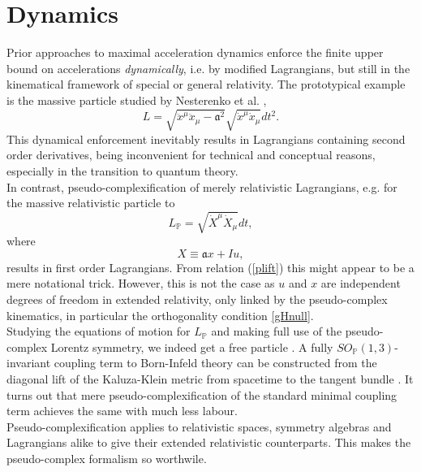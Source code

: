 \documentclass[11pt,a4paper,twoside]{article}
\newcommand{\pc}{\mathbb{P}}
\begin{document}
\section{Dynamics}
Prior approaches \cite{Nestsecond} to maximal acceleration dynamics enforce
the finite upper bound on accelerations \textsl{dynamically}, i.e. by
modified Lagrangians, but still in the kinematical framework of special
or general relativity. The prototypical example is the massive
particle studied by Nesterenko et al. \cite{Nestaction},
\begin{equation}
  L = \sqrt{\ddot x^\mu \ddot x_\mu - \mathfrak{a}^2} \sqrt{\dot x^\mu
  \dot x_\mu} dt^2.
\end{equation}
This dynamical enforcement inevitably results in Lagrangians containing second order
derivatives, being inconvenient for technical and conceptual reasons,
especially in the transition to quantum theory.\\
In contrast, pseudo-complexification of merely relativistic
Lagrangians, e.g. for the massive relativistic particle to
\begin{equation}
 L_\pc = \sqrt{\dot X^\mu \dot X_\mu} dt,
\end{equation}
where
\begin{equation}\label{plift}
  X \equiv \mathfrak{a} x + I u,
\end{equation}
results in first order Lagrangians. From relation (\ref{plift}) this
might appear to be a mere notational trick. However, this is not the
case as $u$ and $x$ are independent degrees of freedom in extended
relativity, only linked by the pseudo-complex kinematics, in
particular the orthogonality condition \ref{gHnull}.\\
Studying the equations of motion for $L_\pc$  and making full use of
the pseudo-complex Lorentz symmetry, we indeed get a free particle
\cite{bik_paper}. A fully
$SO_\pc(1,3)$-invariant coupling term to Born-Infeld theory can be
constructed from the diagonal lift of the Kaluza-Klein metric from
spacetime to the tangent bundle \cite{bik_paper}. It turns out that
mere
pseudo-complexification of the standard minimal coupling term achieves
the same with much less labour.\\
Pseudo-complexification applies to relativistic spaces, symmetry algebras and
Lagrangians alike to give their extended relativistic
counterparts. This makes the pseudo-complex formalism so worthwile.
\end{document}
